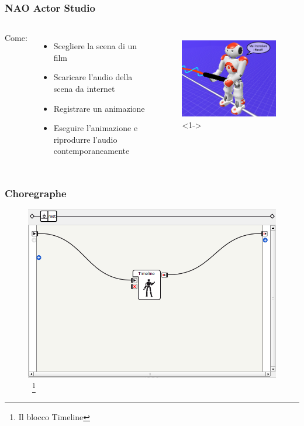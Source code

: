\documentclass[aspectratio=169]{beamer}
\begin{document}
\begin{frame}
\frametitle{NAO Actor Studio}
\begin{columns}
		Come:
		\begin{itemize}
			\item<2-> Scegliere la scena di un film
			\item<3-> Scaricare l'audio della scena da internet
			\item<4-> Registrare un animazione
			\item<5-> Eseguire l'animazione e riprodurre l'audio contemporaneamente
		\end{itemize}
		\begin{figure}[ht]
		\begin{center}
		\includegraphics[width=.9\textwidth]{flussi}<1->
		\end{center}
		\end{figure}
\end{columns}
\end{frame}

\begin{frame}
\frametitle{Choregraphe}
\begin{figure}[ht]
\begin{center}
\includegraphics[width=.6\textwidth]{animation}
~\footnote{Il blocco Timeline}
\end{center}
\end{figure}
\end{frame}
\end{document}
